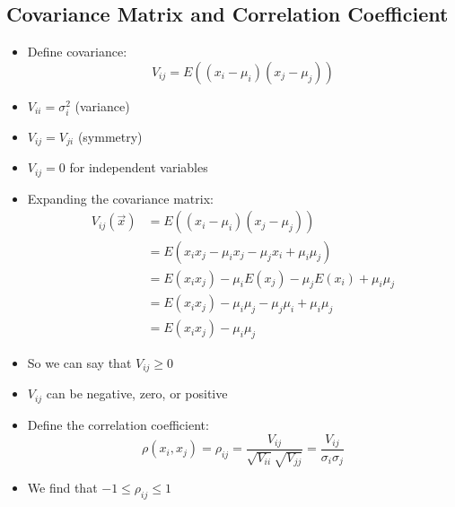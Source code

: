 \subsection{Covariance Matrix and Correlation Coefficient}
\begin{itemize}
    \item Define covariance:
          \[ V_{ij} = E((x_i - \mu_i)(x_j - \mu_j)) \]
    \item $V_{ii} = \sigma_i^2$ (variance)
    \item $V_{ij} = V_{ji}$ (symmetry)
    \item $V_{ij} = 0$ for independent variables
    \item Expanding the covariance matrix:
          \begin{align*}
              V_{ij}(\vec{x}) & = E((x_i- \mu_i)(x_j - \mu_j))                           \\
                              & = E(x_i x_j - \mu_i x_j - \mu_j x_i + \mu_i \mu_j)       \\
                              & = E(x_i x_j) - \mu_i E(x_j) - \mu_j E(x_i) + \mu_i \mu_j \\
                              & = E(x_i x_j) - \mu_i \mu_j - \mu_j \mu_i + \mu_i \mu_j   \\
                              & = E(x_i x_j) - \mu_i \mu_j
          \end{align*}
    \item So we can say that $V_{ij} \ge 0$
    \item $V_{ij}$ can be negative, zero, or positive
    \item Define the correlation coefficient:
          \[ \rho(x_i, x_j) = \rho_{ij} = \frac{V_{ij}}{\sqrt{V_{ii}} \sqrt{V_{jj}}} = \frac{V_{ij}}{\sigma_i \sigma_j} \]
    \item We find that $-1 \le \rho_{ij} \le 1$
\end{itemize}

